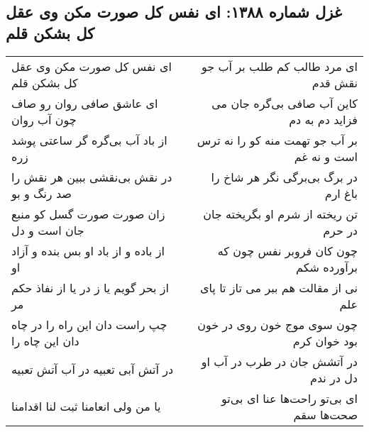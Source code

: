 \begin{center}
\section*{غزل شماره ۱۳۸۸: ای نفس کل صورت مکن وی عقل کل بشکن قلم}
\label{sec:1388}
\begin{longtable}{l p{0.5cm} r}
ای نفس کل صورت مکن وی عقل کل بشکن قلم
&&
ای مرد طالب کم طلب بر آب جو نقش قدم
\\
ای عاشق صافی روان رو صاف چون آب روان
&&
کاین آب صافی بی‌گره جان می فزاید دم به دم
\\
از باد آب بی‌گره گر ساعتی پوشد زره
&&
بر آب جو تهمت منه کو را نه ترس است و نه غم
\\
در نقش بی‌نقشی ببین هر نقش را صد رنگ و بو
&&
در برگ بی‌برگی نگر هر شاخ را باغ ارم
\\
زان صورت صورت گسل کو منبع جان است و دل
&&
تن ریخته از شرم او بگریخته جان در حرم
\\
از باده و از باد او بس بنده و آزاد او
&&
چون کان فروبر نفس چون که برآورده شکم
\\
از بحر گویم یا ز در یا از نفاذ حکم مر
&&
نی از مقالت هم ببر می تاز تا پای علم
\\
چپ راست دان این راه را در چاه دان این چاه را
&&
چون سوی موج خون روی در خون بود خوان کرم
\\
در آتش آبی تعبیه در آب آتش تعبیه
&&
در آتشش جان در طرب در آب او دل در ندم
\\
یا من ولی انعامنا ثبت لنا اقدامنا
&&
ای بی‌تو راحت‌ها عنا ای بی‌تو صحت‌ها سقم
\\
\end{longtable}
\end{center}
